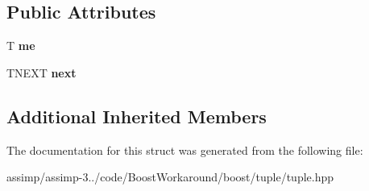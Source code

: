 \subsection*{Public Attributes}
\begin{DoxyCompactItemize}
\item 
\hypertarget{structboost_1_1detail_1_1list__elem_ad44fcaa8e5d6caaa563d1566119077c1}{T {\bfseries me}}\label{structboost_1_1detail_1_1list__elem_ad44fcaa8e5d6caaa563d1566119077c1}

\item 
\hypertarget{structboost_1_1detail_1_1list__elem_a53b02d074650867035a7eef34580a0ad}{T\+N\+E\+X\+T {\bfseries next}}\label{structboost_1_1detail_1_1list__elem_a53b02d074650867035a7eef34580a0ad}

\end{DoxyCompactItemize}
\subsection*{Additional Inherited Members}


The documentation for this struct was generated from the following file\+:\begin{DoxyCompactItemize}
\item 
assimp/assimp-\/3../code/\+Boost\+Workaround/boost/tuple/tuple.\+hpp\end{DoxyCompactItemize}
